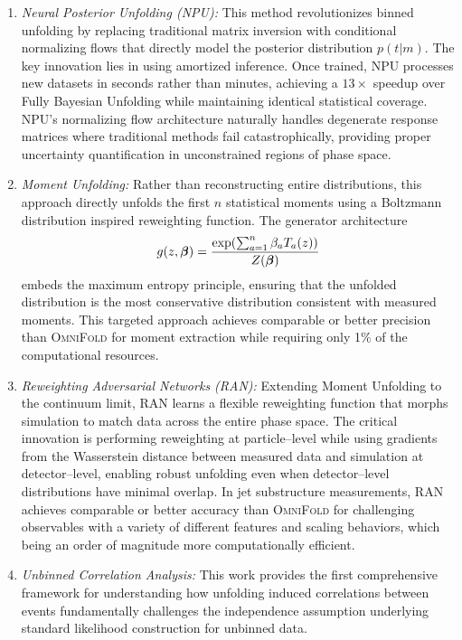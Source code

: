         \begin{enumerate}
            \item \emph{Neural Posterior Unfolding (NPU):} This method revolutionizes binned unfolding by replacing traditional matrix inversion with conditional normalizing flows that directly model the posterior distribution \(p(t|m)\).
            The key innovation lies in using amortized inference.
            Once trained, NPU processes new datasets in seconds rather than minutes, achieving a \( 13 \times \) speedup over Fully Bayesian Unfolding while maintaining identical statistical coverage.
            NPU's normalizing flow architecture naturally handles degenerate response matrices where traditional methods fail catastrophically, providing proper uncertainty quantification in unconstrained regions of phase space.
            \item \emph{Moment Unfolding:} Rather than reconstructing entire distributions, this approach directly unfolds the first \(n\) statistical moments using a Boltzmann distribution inspired reweighting function.
            The generator architecture \[g(z,\vb*{\beta}) = \frac{\exp(\sum_{a=1}^n \beta_a T_a(z))}{Z(\vb*{\beta})}\] embeds the maximum entropy principle, ensuring that the unfolded distribution is the most conservative distribution consistent with measured moments.
            This targeted approach achieves comparable or better precision than \textsc{OmniFold} for moment extraction while requiring only 1\(\%\) of the computational resources.
            \item \emph{Reweighting Adversarial Networks (RAN):} Extending Moment Unfolding to the continuum limit, RAN learns a flexible reweighting function that morphs simulation to match data across the entire phase space.
            The critical innovation is performing reweighting at particle--level while using gradients from the Wasserstein distance between measured data and simulation at detector--level, enabling robust unfolding even when detector--level distributions have minimal overlap.
            In jet substructure measurements, RAN achieves comparable or better accuracy than \textsc{OmniFold} for challenging observables with a variety of different features and scaling behaviors, which being an order of magnitude more computationally efficient.
            \item \emph{Unbinned Correlation Analysis:} This work provides the first comprehensive framework for understanding how unfolding induced correlations between events fundamentally challenges the independence assumption underlying standard likelihood construction for unbinned data.

\end{enumerate}
